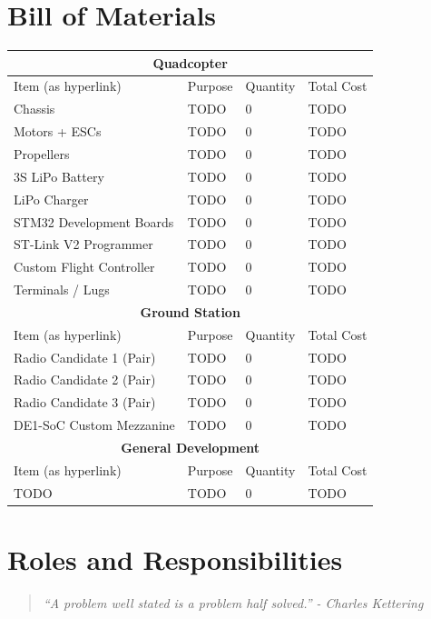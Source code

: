 \documentclass{article}
\begin{document}
\section{Bill of Materials}
\begin{center}
{\renewcommand{\arraystretch}{1.5}
\begin{tabular}{|p{2in}|p{3in}|p{0.6in}|p{0.65in}|}
    \multicolumn{4}{|c|}{\textbf{Quadcopter}} \\
    \hline
    Item (as hyperlink) & Purpose & Quantity & Total Cost \\
    \hline
    Chassis & TODO & 0 & TODO \\
    Motors + ESCs & TODO & 0 & TODO \\
    Propellers & TODO & 0 & TODO \\
    3S LiPo Battery & TODO & 0 & TODO \\
    LiPo Charger & TODO & 0 & TODO \\
    STM32 Development Boards & TODO & 0 & TODO \\
    ST-Link V2 Programmer & TODO & 0 & TODO \\
    Custom Flight Controller & TODO & 0 & TODO \\
    Terminals / Lugs & TODO & 0 & TODO \\
    \hline
    \multicolumn{4}{|c|}{\textbf{Ground Station}} \\
    \hline
    Item (as hyperlink) & Purpose & Quantity & Total Cost \\
    \hline
    Radio Candidate 1 (Pair) & TODO & 0 & TODO \\
    Radio Candidate 2 (Pair) & TODO & 0 & TODO \\
    Radio Candidate 3 (Pair) & TODO & 0 & TODO \\
    DE1-SoC Custom Mezzanine & TODO & 0 & TODO \\
    \hline
    \multicolumn{4}{|c|}{\textbf{General Development}} \\
    \hline
    Item (as hyperlink) & Purpose & Quantity & Total Cost \\
    \hline
    TODO & TODO & 0 & TODO \\
\end{tabular}
}
\end{center}

\section{Roles and Responsibilities}

\begin{quote}
	\textit{``A problem well stated is a problem half
	solved.'' - Charles Kettering}
\end{quote}
\end{document}
